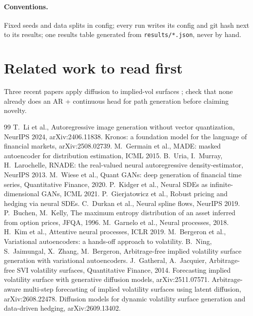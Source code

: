 \documentclass[10pt]{article}
\begin{document}
\paragraph{Conventions.} Fixed seeds and data splits in config; every run writes its config and git hash next to
its results; one results table generated from \texttt{results/*.json}, never by hand.

\section{Related work to read first}
Three recent papers apply diffusion to implied-vol surfaces \cite{ivdiff1,ivdiff2,ivdiff3}; check that none
already does an AR + continuous head for path generation before claiming novelty.

\begin{thebibliography}{99}\small
{} T.~Li et al., Autoregressive image generation without vector quantization, NeurIPS 2024, arXiv:2406.11838.
 Kronos: a foundation model for the language of financial markets, arXiv:2508.02739.
 M.~Germain et al., MADE: masked autoencoder for distribution estimation, ICML 2015.
 B.~Uria, I.~Murray, H.~Larochelle, RNADE: the real-valued neural autoregressive density-estimator, NeurIPS 2013.
 M.~Wiese et al., Quant GANs: deep generation of financial time series, Quantitative Finance, 2020.
 P.~Kidger et al., Neural SDEs as infinite-dimensional GANs, ICML 2021.
 P.~Gierjatowicz et al., Robust pricing and hedging via neural SDEs.
 C.~Durkan et al., Neural spline flows, NeurIPS 2019.
 P.~Buchen, M.~Kelly, The maximum entropy distribution of an asset inferred from option prices, JFQA, 1996.
 M.~Garnelo et al., Neural processes, 2018.
 H.~Kim et al., Attentive neural processes, ICLR 2019.
 M.~Bergeron et al., Variational autoencoders: a hands-off approach to volatility.
 B.~Ning, S.~Jaimungal, X.~Zhang, M.~Bergeron, Arbitrage-free implied volatility surface generation with variational autoencoders.
 J.~Gatheral, A.~Jacquier, Arbitrage-free SVI volatility surfaces, Quantitative Finance, 2014.
 Forecasting implied volatility surface with generative diffusion models, arXiv:2511.07571.
 Arbitrage-aware multi-step forecasting of implied volatility surfaces using latent diffusion, arXiv:2608.22478.
 Diffusion models for dynamic volatility surface generation and data-driven hedging, arXiv:2609.13402.
\end{thebibliography}
\end{document}
